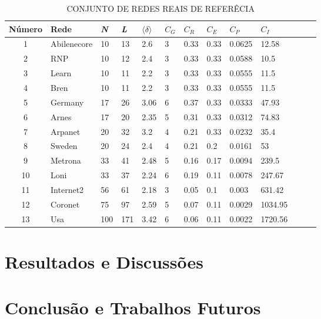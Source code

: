 \documentclass[12pt]{article}
\begin{document}
\begin{table}[htp]
\caption{CONJUNTO DE REDES REAIS DE REFERÊCIA}\label{tab:tab1}
\centering
\begin{tabular}{cll*{9}{l}r}
\hline\rowcolor{Gray}
Número & Rede & \textit{N} & \textit{L} & $\langle \delta \rangle$ & $C_G$ & $C_R$ & $C_E$ & $C_P$ & $C_I$\\ 
\hline
1   &Abilenecore &10    &13     &2.6    &3   &0.33    &0.33     &0.0625     & 12.58\\
2   &RNP        &10     &12     & 2.4   &3   &0.33    &0.33     &0.0588     &10.5\\
3   &Learn      &10     & 11    &2.2    &3   &0.33    &0.33     &0.0555     &11.5\\
4   &Bren       &10     & 11    &2.2    &3   &0.33    &0.33     &0.0555     &11.5\\
5   &Germany    &17     & 26    &3.06   &6   &0.37    &0.33     &0.0333     &47.93\\
6   &Arnes      &17     & 20    &2.35   &5   &0.31    &0.33     &0.0312     &74.83\\
7   &Arpanet    &20     & 32    &3.2    &4   & 0.21   &0.33     & 0.0232    &35.4\\
8   &Sweden     &20     & 24    &2.4    &4   & 0.21   &0.2&     0.0161      &53\\
9   &Metrona    &33     & 41    &2.48   &5   & 0.16   &0.17     & 0.0094    &239.5\\
10  &Loni       &33     & 37    &2.24   & 6  & 0.19   &0.11     & 0.0078    &247.67\\
11  &Internet2  &56     & 61    &2.18   & 3  & 0.05   &0.1      &0.003      &631.42\\
12  &Coronet    &75     & 97    & 2.59  & 5  & 0.07   &0.11     & 0.0029    &1034.95\\
13  &Usa        &100    &171    & 3.42  & 6  &0.06    &0.11     & 0.0022    &1720.56\\
\hline
\end{tabular}
\end{table}
\section{Resultados e Discussões}\label{sec:result}


\section{Conclusão e Trabalhos Futuros}\label{sec:conc}



\end{document}
